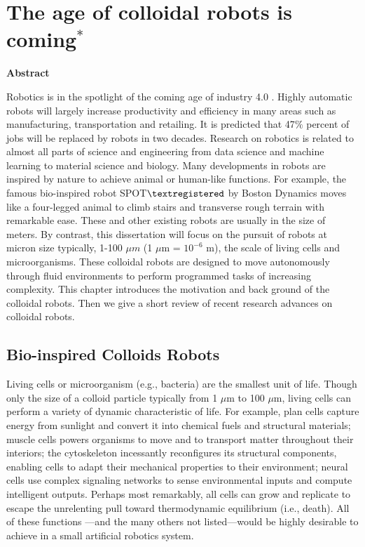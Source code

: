 \chapter{The age of colloidal robots is coming$^{*}$}
\begin{center}
\vspace*{1\baselineskip}
\textbf{Abstract}
\end{center}
Robotics is in the spotlight of the coming age of industry 4.0 \autocite{lasi2014industry}. Highly automatic robots will largely increase productivity and efficiency in many areas such as manufacturing, transportation and retailing. 
It is predicted that 47$\%$ percent of jobs will be replaced by robots in two decades\autocite{frey2017future}.
Research on robotics is related to almost all parts of science and engineering from data science and machine learning to material science and biology. Many developments in robots are inspired by nature to achieve animal or human-like functions. For example,  the famous  bio-inspired robot SPOT$\textregistered$  by Boston Dynamics \autocite{yang2019ten} moves like a four-legged animal to climb stairs and transverse rough terrain with remarkable ease. These and other existing robots are usually in the size of meters. By contrast, this dissertation will focus on the pursuit of robots at micron size typically, 1-100 $\mu m$ (1 $\mu$m = $10^{-6}$ m), the scale of living cells and microorganisms. These colloidal robots are designed to move autonomously through fluid environments to perform programmed tasks of increasing complexity. This chapter introduces the motivation and back ground of the colloidal robots. Then we give a short review of recent research advances on colloidal robots.

\section{Bio-inspired Colloids Robots}
Living cells or microorganism (e.g., bacteria) are the smallest unit of life. Though  only the size of a colloid particle typically from 1 $\mu$m to 100 $\mu$m, living cells can perform  a variety of dynamic characteristic of life. For example, plan cells capture energy from sunlight and convert it into chemical fuels and structural materials; muscle cells powers organisms to move and to transport matter throughout their interiors; the cytoskeleton incessantly reconfigures its structural components, enabling cells to adapt their mechanical properties to their environment; neural cells use complex signaling networks to sense environmental inputs and compute intelligent outputs. Perhaps most remarkably, all cells can grow and replicate to escape the unrelenting pull toward thermodynamic equilibrium (i.e., death).  All of these functions ---and the many others not listed---would be highly desirable to achieve in a small artificial robotics system. 

